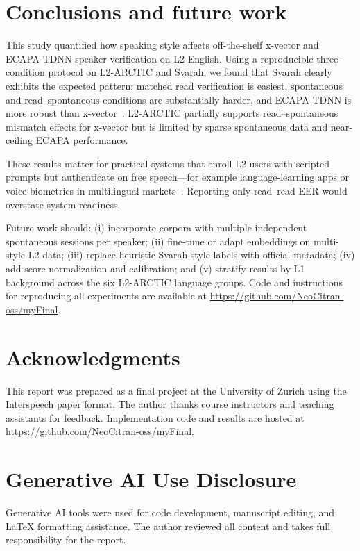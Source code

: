 \documentclass[cameraready]{Interspeech}
\begin{document}
\section{Conclusions and future work}
\label{sec:conclusion}

This study quantified how speaking style affects off-the-shelf x-vector and ECAPA-TDNN speaker verification on L2 English. Using a reproducible three-condition protocol on L2-ARCTIC and Svarah, we found that Svarah clearly exhibits the expected pattern: matched read verification is easiest, spontaneous and read--spontaneous conditions are substantially harder, and ECAPA-TDNN is more robust than x-vector~\cite{desplanques2020ecapa}. L2-ARCTIC partially supports read--spontaneous mismatch effects for x-vector but is limited by sparse spontaneous data and near-ceiling ECAPA performance.

These results matter for practical systems that enroll L2 users with scripted prompts but authenticate on free speech---for example language-learning apps or voice biometrics in multilingual markets~\cite{javed2023svarah,zhao2018l2arctic}. Reporting only read--read EER would overstate system readiness.

Future work should: (i) incorporate corpora with multiple independent spontaneous sessions per speaker; (ii) fine-tune or adapt embeddings on multi-style L2 data; (iii) replace heuristic Svarah style labels with official metadata; (iv) add score normalization and calibration; and (v) stratify results by L1 background across the six L2-ARCTIC language groups. Code and instructions for reproducing all experiments are available at \url{https://github.com/NeoCitran-oss/myFinal}.

\section{Acknowledgments}
This report was prepared as a final project at the University of Zurich using the Interspeech paper format. The author thanks course instructors and teaching assistants for feedback. Implementation code and results are hosted at \url{https://github.com/NeoCitran-oss/myFinal}.

\section{Generative AI Use Disclosure}
Generative AI tools were used for code development, manuscript editing, and LaTeX formatting assistance. The author reviewed all content and takes full responsibility for the report.



\end{document}
